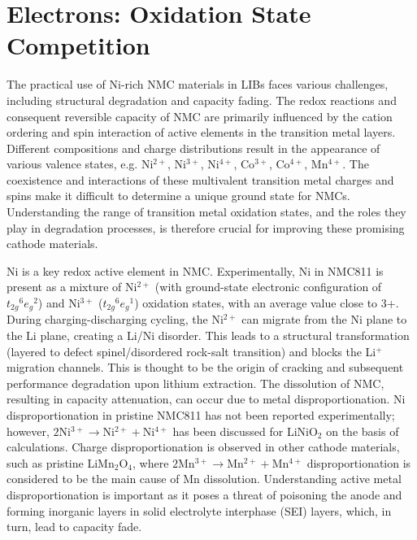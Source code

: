 \documentclass[journal=jacsat,manuscript=article]{achemso}
\begin{document}
\section*{Electrons: Oxidation State Competition}
The practical use of Ni-rich NMC materials in LIBs faces various challenges, including structural degradation and capacity fading. 
The redox reactions and consequent reversible capacity of NMC are primarily influenced by the cation ordering and spin interaction of active elements in the transition metal layers.\cite{Li-acsami-2020,Maleki-aenm.2019,Feng-2019, Xia2018, Xiao_NanoEner2018} 
Different compositions and charge distributions result in the appearance of various valence states, e.g. Ni$^{2+}$, Ni$^{3+}$, Ni$^{4+}$, Co$^{3+}$, Co$^{4+}$, Mn$^{4+}$.\cite{Xiao_NanoEner2018} 
The coexistence and interactions of these multivalent transition metal charges and spins make it difficult to determine a unique ground state for NMCs.\cite{Xiao_NanoEner2018}
Understanding the range of transition metal oxidation states, and the roles they play in degradation processes, is therefore crucial for improving these promising cathode materials.

Ni is a key redox active element in NMC.
Experimentally, Ni in NMC811 is present as a mixture of Ni$^{2+}$ (with ground-state electronic configuration of ${t_{2g}}^{6}{e_{g}}^{2}$) and Ni$^{3+}$ (${t_{2g}}^{6}{e_{g}}^{1}$) oxidation states, with an average value close to 3+.\cite{Zhu_JMatChemA2019,Katharina-chemmater,Kondrakov_JPhysChemC2017}
During charging-discharging cycling, the Ni$^{2+}$ can migrate from the Ni plane to the Li plane, creating a Li/Ni disorder.\cite{Zhang-acs.chemmater-2019, Feng-2019, Xia2018} 
This leads to a structural transformation (layered to defect spinel/disordered rock-salt transition) and blocks the Li$^{+}$  migration channels.\cite{Xia2018}
This is thought to be the origin of cracking and subsequent performance degradation upon lithium extraction.\cite{Katharina-chemmater,Li-aenm-2019,Li-EER-2020}   
The dissolution of NMC, resulting in capacity attenuation, can occur due to metal disproportionation.\cite{buchberger2015} 
Ni disproportionation in pristine NMC811 has not been reported experimentally; however, $2$Ni$^{3+}\rightarrow$Ni$^{2+} + $Ni$^{4+}$ has been discussed for LiNiO$_2$ on the basis of calculations.\cite{HChen_PhysRevB2011} 
Charge disproportionation is observed in other cathode materials, such as pristine LiMn$_2$O$_4$, where $2$Mn$^{3+}\rightarrow$Mn$^{2+} + $Mn$^{4+}$ disproportionation is considered to be the main cause of Mn dissolution. 
Understanding active metal disproportionation is important as it poses a threat of poisoning the anode\cite{Parmar-LMO-2020,PASQUALINI2017} and forming inorganic layers in solid electrolyte interphase (SEI) layers,\cite{joshi2014} which, in turn, lead to capacity fade. 
\end{document}

